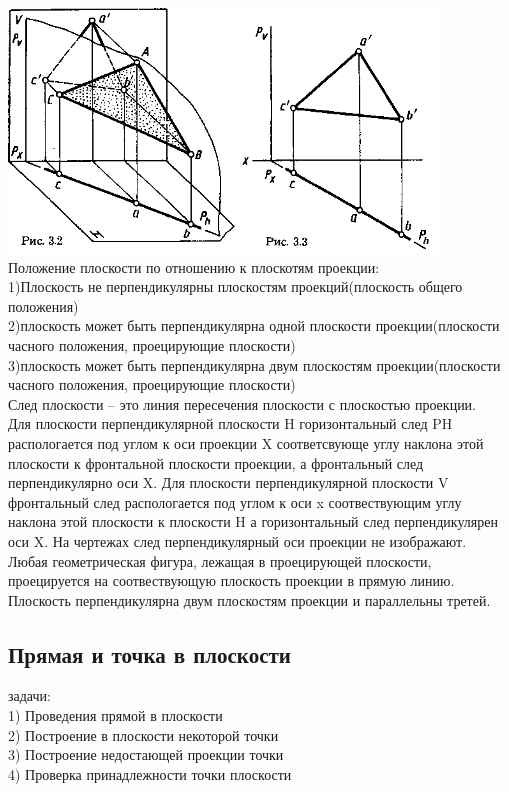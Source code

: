 \documentclass[a4paper, 12pt]{article}
\begin{document}
\includegraphics{img/311.png}\\
Положение плоскости по отношению к плоскотям проекции:\\
1)Плоскость не перпендикулярны плоскостям проекций(плоскость общего положения)\\
2)плоскость может быть перпендикулярна одной плоскости проекции(плоскости часного положения, проецирующие плоскости)\\
3)плоскость может быть перпендикулярна двум плоскостям проекции(плоскости часного положения, проецирующие плоскости)\\

След плоскости -- это линия пересечения плоскости с плоскостью проекции.\\

Для плоскости перпендикулярной плоскости H горизонтальный след PH распологается под углом к оси проекции X соответсвующе углу наклона этой плоскости к фронтальной плоскости проекции, а фронтальный след перпендикулярно оси X. Для плоскости перпендикулярной плоскости V фронтальный след распологается под углом к оси x соотвествующим углу наклона этой плоскости к плоскости H а горизонтальный след перпендикулярен оси X. На чертежах след перпендикулярный оси проекции не изображают.\\

Любая геометрическая фигура, лежащая в проецирующей плоскости, проецируется на соотвествующую плоскость проекции в прямую линию.\\
Плоскость перпендикулярна двум плоскостям проекции и параллельны третей.\\

\subsection{Прямая и точка в плоскости}
задачи:\\
1) Проведения прямой в плоскости\\
2) Построение в плоскости некоторой точки\\
3) Построение недостающей проекции точки\\
4) Проверка принадлежности точки плоскости\\
\end{document}

